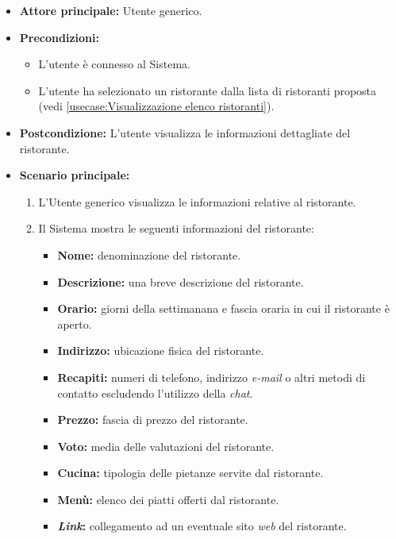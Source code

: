 \label{usecase:Visualizzazione di un ristorante}
\begin{itemize}
	\item \textbf{Attore principale:} Utente generico.


	\item \textbf{Precondizioni:}
	\begin{itemize}
        \item L'utente è connesso al Sistema.
        \item L'utente ha selezionato un ristorante dalla lista di ristoranti proposta (vedi \autoref{usecase:Visualizzazione elenco ristoranti}).
    \end{itemize}

	\item \textbf{Postcondizione:} L'utente visualizza le informazioni dettagliate del ristorante.

	\item \textbf{Scenario principale:}
		\begin{enumerate}
		    \item L'Utente generico visualizza le informazioni relative al ristorante.
		    \item Il Sistema mostra le seguenti informazioni del ristorante:
		    \begin{itemize}
				\item \textbf{Nome:} denominazione del ristorante.
				\item \textbf{Descrizione:} una breve descrizione del ristorante.
				\item \textbf{Orario:} giorni della settimanana e fascia oraria in cui il ristorante è aperto.
				\item \textbf{Indirizzo:} ubicazione fisica del ristorante.
				\item \textbf{Recapiti:} numeri di telefono, indirizzo \textit{e-mail} o altri metodi di contatto escludendo l'utilizzo della \textit{chat}.
				\item \textbf{Prezzo:} fascia di prezzo del ristorante.
				\item \textbf{Voto:} media delle valutazioni del ristorante.
				\item \textbf{Cucina:} tipologia delle pietanze servite dal ristorante.
				\item \textbf{Menù:} elenco dei piatti offerti dal ristorante.
				\item \textbf{\textit{Link}:} collegamento ad un eventuale sito \textit{web} del ristorante. 
			\end{itemize}
	    \end{enumerate}

\end{itemize}